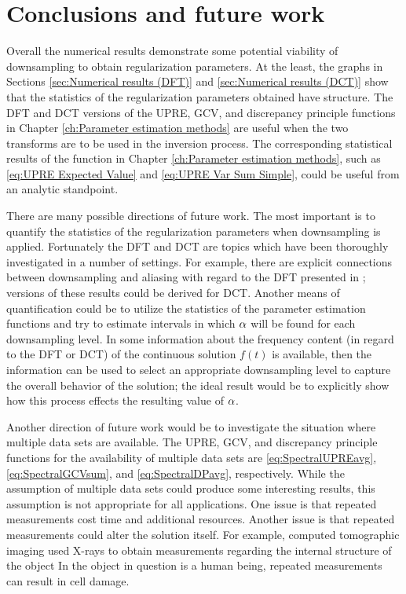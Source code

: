 \chapter{Conclusions and future work} \label{ch:Conclusion}
Overall the numerical results demonstrate some potential viability of downsampling to obtain regularization parameters. At the least, the graphs in Sections \ref{sec:Numerical results (DFT)} and \ref{sec:Numerical results (DCT)} show that the statistics of the regularization parameters obtained have structure. The DFT and DCT versions of the UPRE, GCV, and discrepancy principle functions in Chapter \ref{ch:Parameter estimation methods} are useful when the two transforms are to be used in the inversion process. The corresponding statistical results of the function in Chapter \ref{ch:Parameter estimation methods}, such as \eqref{eq:UPRE Expected Value} and \eqref{eq:UPRE Var Sum Simple}, could be useful from an analytic standpoint. \par 
There are many possible directions of future work. The most important is to quantify the statistics of the regularization parameters when downsampling is applied. Fortunately the DFT and DCT are topics which have been thoroughly investigated in a number of settings. For example, there are explicit connections between downsampling and aliasing with regard to the DFT presented in \cite[Ch.~7]{AudioDFT}; versions of these results could be derived for DCT.  Another means of quantification could be to utilize the statistics of the parameter estimation functions and try to estimate intervals in which $\alpha$ will be found for each downsampling level. In some information about the frequency content (in regard to the DFT or DCT) of the continuous solution $f(t)$ is available, then the information can be used to select an appropriate downsampling level to capture the overall behavior of the solution; the ideal result would be to explicitly show how this process effects the resulting value of $\alpha$. \par 
Another direction of future work would be to investigate the situation where multiple data sets are available. The UPRE, GCV, and discrepancy principle functions for the availability of multiple data sets are \eqref{eq:SpectralUPREavg}, \eqref{eq:SpectralGCVsum}, and \eqref{eq:SpectralDPavg}, respectively. While the assumption of multiple data sets could produce some interesting results, this assumption is not appropriate for all applications. One issue is that repeated measurements cost time and additional resources. Another issue is that repeated measurements could alter the solution itself. For example, computed tomographic imaging used X-rays to obtain measurements regarding the internal structure of the object \cite[p.~12-14]{ABT} In the object in question is a human being, repeated measurements can result in cell damage. \par 
